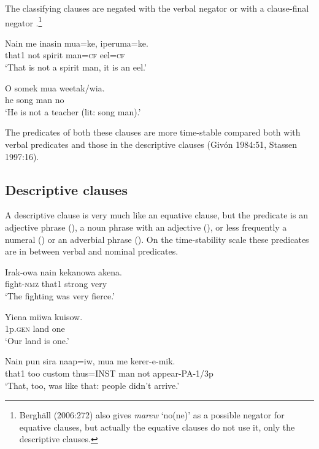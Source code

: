 The classifying clauses are negated with the verbal negator  or with a clause-final negator .\footnote{Bergh\"all (2006:272) also gives \textit{marew} `no(ne)' as a possible negator for equative clauses, but actually the equative clauses do not use it, only the descriptive clauses.} 

\ea%
\label{ex:x980}
\gll Nain  me  inasin  mua=ke,  iperuma=ke. \\
     that1  not  spirit  man=\textsc{cf}  eel=\textsc{cf} \\
\glt `That is not a spirit man, it is an eel.'
\z

\ea%
\label{ex:x984}
\gll O  somek  mua  weetak/wia. \\
     he  song  man  no \\
\glt `He is not a teacher (lit: song man).' 
\z

The predicates of both these clauses are more time-stable compared both with verbal predicates and those in the descriptive clauses (Giv\'on 1984:51, Stassen 1997:16). 

\subsection{Descriptive clauses}
\hypertarget{RefHeading22201935131865}{}
A descriptive clause is very much like an equative clause, but the predicate is an adjective phrase (), a noun phrase with an adjective (), or less frequently a numeral () or an adverbial phrase (). On the time-stability scale these predicates are in between verbal and nominal predicates. 

\ea%
\label{ex:x974}
\gll Irak-owa  nain  kekanowa  akena. \\
     fight-\textsc{nmz}  that1  strong  very \\
\glt `The fighting was very fierce.'
\z

\ea%
\label{ex:x979}
\gll Yiena  miiwa  kuisow. \\
     1p.\textsc{gen}  land  one \\
\glt `Our land is one.'
\z

\ea%
\label{ex:x985}
\gll Nain  pun  sira  naap=iw,  mua  me  kerer-e-mik. \\
     that1  too  custom  thus=INST  man  not  appear-PA-1/3p \\
\glt `That, too, was like that: people didn't arrive.'
\z

